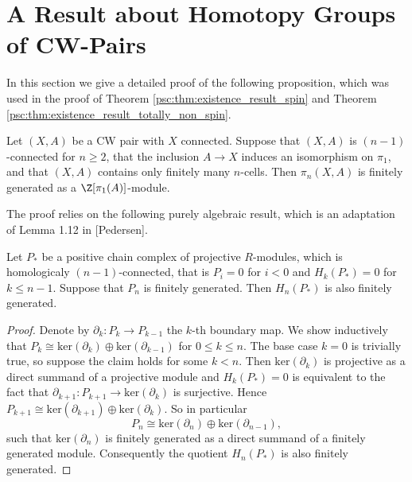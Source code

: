 \section{A Result about Homotopy Groups of CW-Pairs}

In this section we give a detailed proof of the following proposition, which was used in the proof of Theorem \ref{psc:thm:existence_result_spin} and Theorem \ref{psc:thm:existence_result_totally_non_spin}.

\begin{proposition}
    \label{appendix2:prop:finite_generation_lemma}
    Let $(X,A)$ be a CW pair with $X$ connected. Suppose that $(X,A)$ is $(n-1)$-connected for $n \geq 2$, that the inclusion $A \to X$ induces an isomorphism on $\pi_1$, and that $(X,A)$ contains only finitely many $n$-cells. Then $\pi_n(X,A)$ is finitely generated as a $\Z[\pi_1(A)]$-module.
\end{proposition}

The proof relies on the following purely algebraic result, which is an adaptation of Lemma 1.12 in [Pedersen].

\begin{lemma}
    \label{appendix2:lem:homological_algebra_lemma}
    Let $P_\ast$ be a positive chain complex of projective $R$-modules, which is homologicaly $(n-1)$-connected, that is $P_i = 0$ for $i < 0$ and $H_k(P_\ast) = 0$ for $k \leq n-1$. Suppose that $P_n$ is finitely generated. Then $H_n(P_\ast)$ is also finitely generated.
\end{lemma}

\begin{proof}
    Denote by $\partial_k \colon P_k \to P_{k-1}$ the $k$-th boundary map. We show inductively that $P_k \cong \mathrm{ker}(\partial_k) \oplus \mathrm{ker}(\partial_{k-1})$ for $0 \leq k \leq n$. The base case $k = 0$ is trivially true, so suppose the claim holds for some $k < n$. Then $\mathrm{ker}(\partial_k)$ is projective as a direct summand of a projective module and $H_{k}(P_\ast) = 0$ is equivalent to the fact that $\partial_{k+1} \colon P_{k+1} \to \mathrm{ker}(\partial_k)$ is surjective. Hence $P_{k+1} \cong \mathrm{ker}(\partial_{k+1}) \oplus \mathrm{ker}(\partial_k)$. So in particular
    \[
    P_n \cong \mathrm{ker}(\partial_n) \oplus \mathrm{ker}(\partial_{n-1}),
    \]
    such that $\mathrm{ker}(\partial_n)$ is finitely generated as a direct summand of a finitely generated module. Consequently the quotient $H_n(P_\ast)$ is also finitely generated. 
\end{proof}

